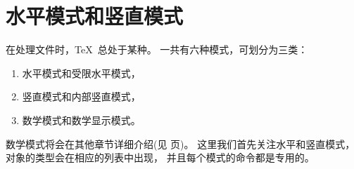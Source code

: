 \documentclass{book}
\begin{document}
\chapter{水平模式和竖直模式}\label{hvmode}
\label{chap:hvmode}

在处理文件时，\TeX\ 总处于某种。
一共有六种模式，可划分为三类：
\begin{enumerate}
\item 水平模式和受限水平模式，
\item 竖直模式和内部竖直模式，
\item 数学模式和数学显示模式。
\end{enumerate}
数学模式将会在其他章节详细介绍(见 \pageref{math:modes} 页)。
这里我们首先关注水平和竖直模式，对象的类型会在相应的列表中出现，
并且每个模式的命令都是专用的。
\end{document}
